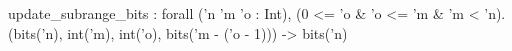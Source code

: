 update_subrange_bits : forall ('n 'm 'o : Int), (0 <= 'o & 'o <= 'm & 'm < 'n).
  (bits('n), int('m), int('o), bits('m - ('o - 1))) -> bits('n)